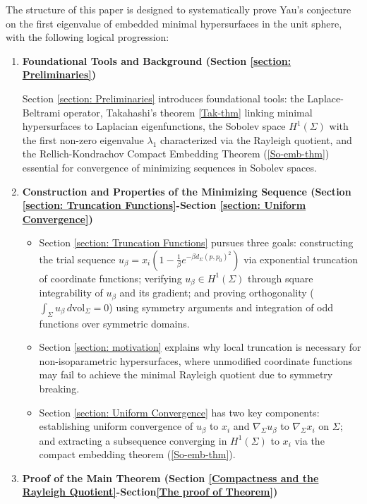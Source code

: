 \documentclass[a4, 12pt]{amsart}
\numberwithin{equation}{section} \numberwithin{equation}{section}
\begin{document}
The structure of this paper is designed to systematically prove Yau's conjecture on the first eigenvalue of embedded minimal hypersurfaces in the unit sphere, with the following logical progression:
\begin{enumerate}
    \item \textbf{Foundational Tools and Background (Section \ref{section: Preliminaries})}

           Section \ref{section: Preliminaries} introduces foundational tools: the Laplace-Beltrami operator, Takahashi's theorem \ref{Tak-thm} linking minimal hypersurfaces to Laplacian eigenfunctions, the Sobolev space $H^1(\Sigma)$ with the first non-zero eigenvalue $\lambda_1$ characterized via the Rayleigh quotient, and the Rellich-Kondrachov Compact Embedding Theorem (\ref{So-emb-thm}) essential for convergence of minimizing sequences in Sobolev spaces.


    \item \textbf{Construction and Properties of the Minimizing Sequence (Section  \ref{section: Truncation Functions}-Section \ref{section: Uniform Convergence})}
    \begin{itemize}
        \item[(i)] Section \ref{section: Truncation Functions} pursues three goals: constructing the trial sequence $u_\beta = x_i \left(1-\frac{1}{\beta} e^{-\beta d_\Sigma(p, p_0)^2}\right)$ via exponential truncation of coordinate functions; verifying $u_\beta \in H^1(\Sigma)$ through square integrability of $u_\beta$ and its gradient; and proving orthogonality ($\int_\Sigma u_\beta \, d\mathrm{vol}_\Sigma = 0$) using symmetry arguments and integration of odd functions over symmetric domains.
        \item[(ii)] Section \ref{section: motivation} explains why local truncation is necessary for non-isoparametric hypersurfaces, where unmodified coordinate functions may fail to achieve the minimal Rayleigh quotient due to symmetry breaking.
        \item[(iii)] Section \ref{section: Uniform Convergence} has two key components: establishing uniform convergence of $u_\beta$ to $x_i$ and $\nabla_\Sigma u_\beta$ to $\nabla_\Sigma x_i$ on $\Sigma$; and extracting a subsequence converging in $H^1(\Sigma)$ to $x_i$ via the compact embedding theorem (\ref{So-emb-thm}).
    \end{itemize}

    \item \textbf{Proof of the Main Theorem (Section \ref{Compactness and the Rayleigh Quotient}-Section\ref{The proof of Theorem})}


\end{enumerate}
\end{document}
